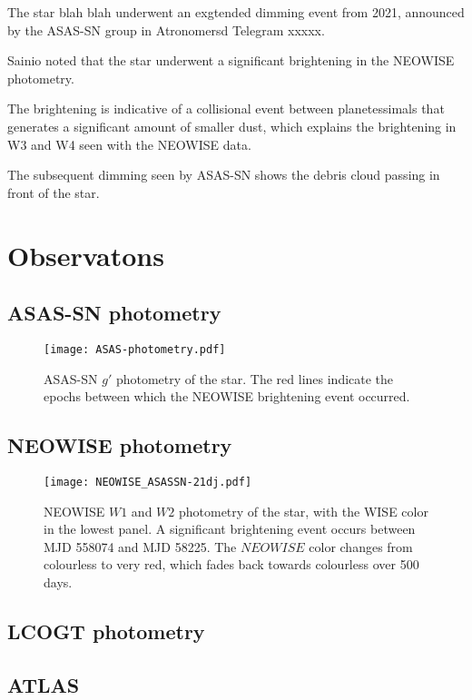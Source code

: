 \documentclass{aa}
\begin{document}
The star blah blah underwent an exgtended dimming event from 2021, announced by the ASAS-SN group in Atronomersd Telegram xxxxx.


Sainio noted that the star underwent a significant brightening in the NEOWISE photometry.

The brightening is indicative of a collisional event between planetessimals that generates a significant amount of smaller dust, which explains the brightening in W3 and W4 seen with the NEOWISE data.

The subsequent dimming seen by ASAS-SN shows the debris cloud passing in front of the star.


\section{Observatons}

\subsection{ASAS-SN photometry}
 \begin{figure}
   \centering
   \texttt{[image: ASAS-photometry.pdf]}
      \caption{ASAS-SN $g'$ photometry of the star. The red lines indicate the epochs between which the NEOWISE brightening event occurred.
              }
         \label{fig:asphot}
   \end{figure}

\subsection{NEOWISE photometry}

\begin{figure}
   \centering
   \texttt{[image: NEOWISE\_ASASSN-21dj.pdf]}
      \caption{NEOWISE $W1$ and $W2$ photometry of the star, with the WISE color in the lowest panel.
      A significant brightening event occurs between MJD 558074 and MJD 58225.
      The $NEOWISE$ color changes from colourless to very red, which fades back towards colourless over 500 days.
              }
         \label{fig:wisephot}
   \end{figure}
   
\subsection{LCOGT photometry}

\subsection{ATLAS}
\end{document}
